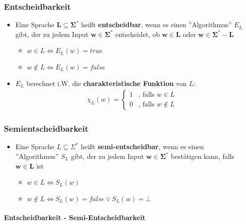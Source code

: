 \documentclass{scrartcl}
\begin{document}
\subsubsection{Entscheidbarkeit}

\begin{itemize}
	\item Eine Sprache $\mathbf{L \subseteq \Sigma^*}$ heißt \textbf{entscheidbar}, wenn es einen ''Algorithmus'' $E_L$ gibt, der zu jedem Input $\mathbf{w \in \Sigma^*}$ entscheidet, ob $\mathbf{w \in L}$ oder $\mathbf{w \in \Sigma^* - L}$
	\begin{itemize}
		\item $w \in L \iff E_L(w) = true$
		\item $w \not \in L \iff E_L(w) = false$
	\end{itemize}
	\item $E_L$ berechnet i.W. die \textbf{charakteristische Funktion} von $L$:
	\begin{align*}
		\chi_L(w) = \begin{cases}
			1 & \text{, falls } w \in L \\
			0 & \text{, falls } w \not \in L
		\end{cases}
	\end{align*}
\end{itemize}

\subsubsection{Semientscheidbarkeit}

\begin{itemize}
	\item Eine Sprache $L \subseteq \Sigma^*$ heißt \textbf{semi-entscheidbar}, wenn es einen ''Algorithmus'' $S_L$ gibt, der zu jedem Input $\mathbf{w \in \Sigma^*}$ bestätigen kann, falls $\mathbf{w \in L}$ ist
	\begin{itemize}
		\item $w \in L \iff S_L(w)$
		\item $w \not \in L \iff S_L(w) = false \vee S_L(w) = \bot$
	\end{itemize}
\end{itemize}

\paragraph{Entscheidbarkeit - Semi-Entscheidbarkeit}
\end{document}
